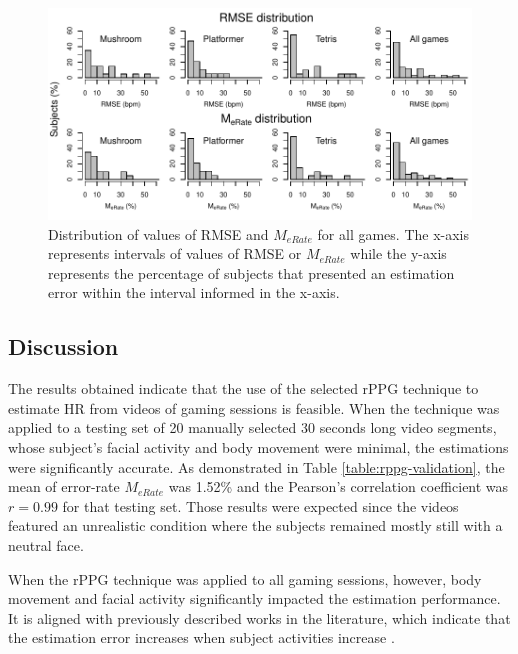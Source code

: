 \begin{figure}[!h]
\centering
\includegraphics[width=1.0\textwidth]{Content/figures/hist-rmse-mrate.pdf}
\caption{Distribution of values of RMSE and $M_{eRate}$ for all games. The x-axis represents intervals of values of RMSE or $M_{eRate}$ while the y-axis represents the percentage of subjects that presented an estimation error within the interval informed in the x-axis.}
\label{fig:chart-hists}
\end{figure}

\subsection{Discussion}

The results obtained indicate that the use of the selected rPPG technique to estimate HR from videos of gaming sessions is feasible. When the technique was applied to a testing set of 20 manually selected 30 seconds long video segments, whose subject's facial activity and body movement were minimal, the estimations were significantly accurate. As demonstrated in Table \ref{table:rppg-validation}, the mean of error-rate $M_{eRate}$ was 1.52\% and the Pearson's correlation coefficient was $r = 0.99$ for that testing set. Those results were expected since the videos featured an unrealistic condition where the subjects remained mostly still with a neutral face.

When the rPPG technique was applied to all gaming sessions, however, body movement and facial activity significantly impacted the estimation performance. It is aligned with previously described works in the literature, which indicate that the estimation error increases when subject activities increase \parencite{Wang_2016novel}.

